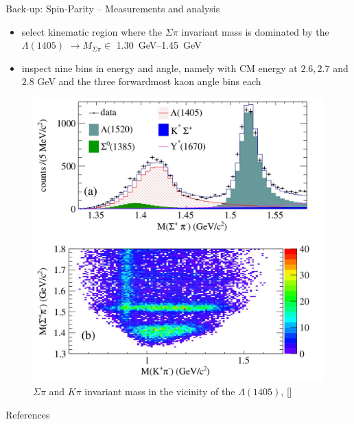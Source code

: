 \documentclass[11pt,aspectratio=1610,dvipsnames]{beamer}
\begin{document}
\begin{frame}{Back-up: Spin-Parity -- Measurements and analysis}
	\begin{minipage}{.4\linewidth}
		\begin{tcolorbox}[colback=black!10,colframe=gray!20!black,title=Event selection] 
			\begin{itemize}
				\item select kinematic region where the $\Sigma\pi$ invariant mass is dominated by the $\Lambda(1405)$ $\to M_{\Sigma\pi}\in$ \SIrange{1.30}{1.45}{\giga\eV}
				\item inspect nine bins in energy and angle, namely with CM energy at $2.6, 2.7$ and $2.8$ GeV and the  three forwardmost kaon angle bins each
			\end{itemize}
		\end{tcolorbox}	
	\end{minipage}
	\begin{minipage}{.57\linewidth}
		\begin{figure}
			\centering
			\includegraphics[width=.95\linewidth]{events_pol}
			\caption*{$\Sigma\pi$  and $K\pi$ invariant mass in the vicinity of the $\Lambda(1405)$,  [\cite{spinparity}]}
		\end{figure}
	\end{minipage}
\end{frame}


\begin{frame}{References}
	\printbibliography
\end{frame}
\end{document}
